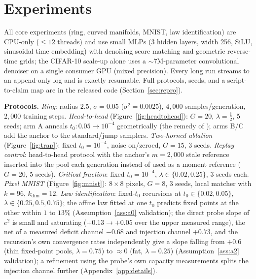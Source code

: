 \documentclass[11pt]{article}
\theoremstyle{remark}
\newcommand{\sigsq}{\sigma^2}
\begin{document}
\section{Experiments}\label{sec:experiments}

All core experiments (ring, curved manifolds, MNIST, law identification) are CPU-only
($\le12$ threads) and use small MLPs (3 hidden layers, width 256, SiLU, sinusoidal time
embedding) with denoising score matching and geometric reverse-time grids; the CIFAR-10
scale-up alone uses a $\sim$7M-parameter convolutional denoiser on a single consumer
GPU (mixed precision). Every long run streams to an append-only log and is exactly
resumable. Full protocols, seeds, and a script-to-claim map are in the released
code (Section~\ref{sec:repro}).

\textbf{Protocols.} \emph{Ring}: radius $2.5$, $\sigma=0.05$ ($\sigsq=0.0025$), $4{,}000$
samples/generation, $2{,}000$ training steps. \emph{Head-to-head}
(Figure~\ref{fig:headtohead}): $G=20$, $\lambda=\tfrac12$, 5 seeds; arm A anneals
$t_0\!:0.05\to10^{-4}$ geometrically (the remedy of \citealp{khelifa2026recursive});
arms B/C add the anchor to the standard/jump samplers. \emph{Two-horned ablation}
(Figure~\ref{fig:trap}): fixed $t_0=10^{-4}$, noise on/zeroed, $G=15$, 3 seeds.
\emph{Replay control}: head-to-head protocol with the anchor's $m{=}2{,}000$ stale
reference inserted into the pool each generation instead of used as a moment reference
($G=20$, 5 seeds). \emph{Critical fraction}: fixed $t_0=10^{-4}$,
$\lambda\in\{0.02,0.25\}$, 3 seeds each. \emph{Pixel MNIST} (Figure~\ref{fig:mnist}):
$8\times8$ pixels, $G=8$, 3 seeds,
local matcher with $k=96$, $k_{\dim}=12$. \emph{Law identification}: fixed-$t_0$
recursions at $t_0\in\{0.02,0.05\}$, $\lambda\in\{0.25,0.5,0.75\}$; the affine law
fitted at one $t_0$ predicts fixed points at the other within $1$ to $13\%$
(Assumption~\ref{ass:a0} validation); the direct probe slope of $e^2$ is small and
saturating ($+0.13\to+0.05$ over the upper measured range), the net of a measured
deficit channel $-0.68$ and injection channel $+0.73$, and the recursion's own
convergence rates independently give a slope falling from $+0.6$ (thin fixed-point
pools, $\lambda=0.75$) to $\approx0$ (fat, $\lambda=0.25$)
(Assumption~\ref{ass:a2} validation); a refinement using the
probe's own capacity measurements splits the injection channel further
(Appendix~\ref{app:details}).
\end{document}
